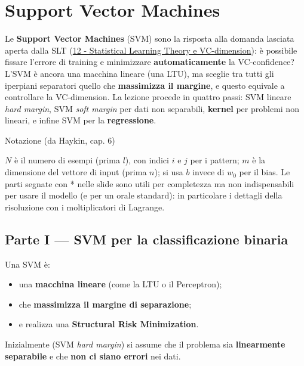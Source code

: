 \chapter{Support Vector Machines}\label{ch-13}

Le \textbf{Support Vector Machines} (SVM) sono la risposta alla domanda
lasciata aperta dalla SLT
(\href{12\%20-\%20Statistical\%20Learning\%20Theory\%20e\%20VC-dimension}{12
- Statistical Learning Theory e VC-dimension}): è possibile fissare
l'errore di training e minimizzare \textbf{automaticamente} la
VC-confidence? L'SVM è ancora una macchina lineare (una LTU), ma sceglie
tra tutti gli iperpiani separatori quello che \textbf{massimizza il
margine}, e questo equivale a controllare la VC-dimension. La lezione
procede in quattro passi: SVM lineare \emph{hard margin}, SVM \emph{soft
margin} per dati non separabili, \textbf{kernel} per problemi non
lineari, e infine SVM per la \textbf{regressione}.

\begin{boxnote}{Notazione (da Haykin, cap. 6)}

\(N\) è il numero di esempi (prima \(l\)), con indici \(i\) e \(j\) per
i pattern; \(m\) è la dimensione del vettore di input (prima \(n\)); si
usa \(b\) invece di \(w_0\) per il bias. Le parti segnate con * nelle
slide sono utili per completezza ma non indispensabili per usare il
modello (e per un orale standard): in particolare i dettagli della
risoluzione con i moltiplicatori di Lagrange.

\end{boxnote}

\section{Parte I --- SVM per la classificazione
binaria}\label{parte-i-svm-per-la-classificazione-binaria}

Una SVM è:

\begin{itemize}
\tightlist
\item
  una \textbf{macchina lineare} (come la LTU o il Perceptron);
\item
  che \textbf{massimizza il margine di separazione};
\item
  e realizza una \textbf{Structural Risk Minimization}.
\end{itemize}

Inizialmente (SVM \emph{hard margin}) si assume che il problema sia
\textbf{linearmente separabile} e che \textbf{non ci siano errori} nei
dati.

